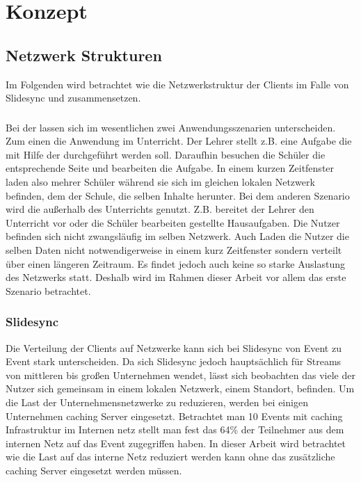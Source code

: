 \chapter{Konzept}\label{ch:concept}
%

\section{Netzwerk Strukturen}

Im Folgenden wird betrachtet wie die Netzwerkstruktur der Clients im Falle von Slidesync und \schulCloud zusammensetzen.
\subsection{\schulCloud}
Bei der \schulCloud lassen sich im wesentlichen zwei Anwendungsszenarien unterscheiden. Zum einen die Anwendung im Unterricht. Der Lehrer stellt z.B. eine Aufgabe die mit Hilfe der \schulCloud durchgeführt werden soll. Daraufhin besuchen die Schüler die entsprechende Seite und bearbeiten die Aufgabe. In einem kurzen Zeitfenster laden also mehrer Schüler während sie sich im gleichen lokalen Netzwerk befinden, dem der Schule, die selben Inhalte herunter. Bei dem anderen Szenario wird die \schulCloud außerhalb des Unterrichts genutzt. Z.B. bereitet der Lehrer den Unterricht vor oder die Schüler bearbeiten gestellte Hausaufgaben. Die Nutzer befinden sich nicht zwangsläufig im selben Netzwerk. Auch Laden die Nutzer die selben Daten nicht notwendigerweise in einem kurz Zeitfenster sondern verteilt über einen längeren Zeitraum. Es findet jedoch auch keine so starke Auslastung des Netzwerks statt. Deshalb wird im Rahmen dieser Arbeit vor allem das erste Szenario betrachtet.

\subsection{Slidesync}
Die Verteilung der Clients auf Netzwerke kann sich bei Slidesync von Event zu Event stark unterscheiden. Da sich Slidesync jedoch hauptsächlich für Streams von mittleren bis großen Unternehmen wendet, lässt sich beobachten das viele der Nutzer sich gemeinsam in einem lokalen Netzwerk, einem Standort, befinden. Um die Last der Unternehmensnetzwerke zu reduzieren, werden bei einigen Unternehmen caching Server eingesetzt. Betrachtet man 10 Events mit caching Infrastruktur im Internen netz stellt man fest das 64\% der Teilnehmer aus dem internen Netz  auf das Event zugegriffen haben. In dieser Arbeit wird betrachtet wie die Last auf das interne Netz reduziert werden kann ohne das zusätzliche caching Server eingesetzt werden müssen.

